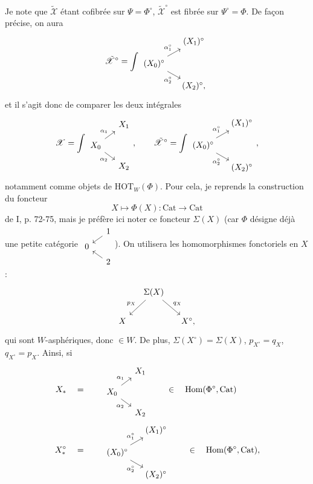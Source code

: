 \documentclass[11pt]{article}
\newcommand{\printedpage}[1]{\marginpar{\footnotesize p.~#1}}
\newcommand{\msp}[1]{\marginpar{\footnotesize [#1]}}
\newcommand{\Cat}{\mathrm{Cat}}
\newcommand{\Hom}{\mathrm{Hom}}
\newcommand{\HOT}{\mathrm{HOT}}
\newcommand{\sX}{\mathscr{X}}
\newcommand{\tsX}{\tilde{\mathscr{X}}}
\begin{document}
\printedpage{93}

Je note que $\tsX$ étant cofibrée sur $\Psi=\Phi^\circ$, $\tsX^\circ$ est fibrée sur $\Psi^\circ=\Phi$. De façon précise, on aura
\[
\tsX^\circ = \int
\begin{tikzcd}[row sep=small, column sep=small]
 & (X_1)^\circ \\
(X_0)^\circ \arrow[ur, "\alpha_1^\circ"] \arrow[dr, "\alpha_2^\circ"'] & \\
 & (X_2)^\circ,
\end{tikzcd}
\]
\msp{page 137}
et il s'agit donc de comparer les deux intégrales
\[
\sX = \int
\begin{tikzcd}[row sep=small, column sep=small]
 & X_1 \\
X_0 \arrow[ur, "\alpha_1"] \arrow[dr, "\alpha_2"'] & \\
 & X_2
\end{tikzcd}
, \qquad
\tsX^\circ = \int
\begin{tikzcd}[row sep=small, column sep=small]
 & (X_1)^\circ \\
(X_0)^\circ \arrow[ur, "\alpha_1^\circ"] \arrow[dr, "\alpha_2^\circ"'] & \\
 & (X_2)^\circ
\end{tikzcd}
,
\]
notamment comme objets de $\HOT_W(\Phi)$. Pour cela, je reprends la construction du foncteur
\[
X \longmapsto \Phi(X) : \Cat \longrightarrow \Cat
\]
de I, p. 72-75, mais je préfère ici noter ce foncteur $\Sigma(X)$ (car $\Phi$ désigne déjà une petite catégorie $\begin{tikzcd}[row sep=tiny, column sep=small]
 & 1 \arrow[dl] \\
0 & \\
 & 2 \arrow[ul]
\end{tikzcd}$). On utilisera les homomorphismes fonctoriels en $X$ :
\[
\begin{tikzcd}[column sep=small]
 & \Sigma(X) \arrow[dl, "p_X"'] \arrow[dr, "q_X"] & \\
X & & X^\circ,
\end{tikzcd}
\]
qui sont $W$-asphériques, donc $\in W$. De plus, $\Sigma(X^\circ)=\Sigma(X)$, $p_{X^\circ}=q_X$, $q_{X^\circ}=p_X$. Ainsi, si
\[
\begin{aligned}
X_* \quad &= \qquad
\begin{tikzcd}[ampersand replacement=\&, row sep=small, column sep=small]
 \& X_1 \\
X_0 \arrow[ur, "\alpha_1"] \arrow[dr, "\alpha_2"'] \& \\
 \& X_2
\end{tikzcd}
\qquad \in \quad \Hom(\Phi^\circ,\Cat)\\
X_*^\circ \quad &= \qquad
\begin{tikzcd}[ampersand replacement=\&, row sep=small, column sep=small]
 \& (X_1)^\circ \\
(X_0)^\circ \arrow[ur, "\alpha_1^\circ"] \arrow[dr, "\alpha_2^\circ"'] \& \\
 \& (X_2)^\circ
\end{tikzcd}
\qquad \in \quad \Hom(\Phi^\circ,\Cat),
\end{aligned}
\]
\end{document}

